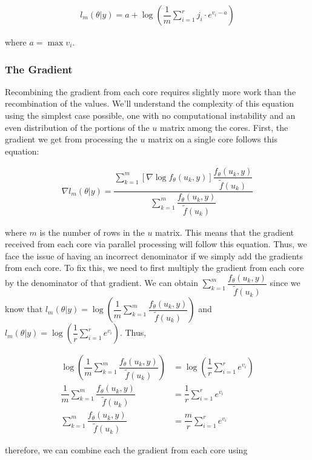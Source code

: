 \documentclass{article}
\begin{document}
\begin{align}
l_m(\theta|y) = a + \log(\dfrac{1}{m}\sum\limits_{i=1}^r j_i \cdot e^{v_i - a})
\end{align}

\noindent where $a = \max{v_i}$.

\subsubsection{The Gradient}
Recombining the gradient from each core requires slightly more work than the recombination of the values. We'll understand the complexity of this equation using the simplest case possible, one with no computational instability and an even distribution of the portions of the $u$ matrix among the cores. First, the gradient we get from processing the $u$ matrix on a single core follows this equation: 

\begin{align}
\nabla l_m(\theta|y)=
\dfrac{\sum_{k=1}^m   \left[  \nabla  \log f_\theta(u_k,y) \right]  \dfrac{f_\theta(u_k,y)}{\tilde{f}(u_k)} }{\sum_{k=1}^m  \dfrac{f_\theta(u_k,y)}{\tilde{f}(u_k)}  } 
\end{align}

\noindent where $m$ is the number of rows in the $u$ matrix. This means that the gradient received from each core via parallel processing will follow this equation. Thus, we face the issue of having an incorrect denominator if we simply add the gradients from each core. To fix this, we need to first multiply the gradient from each core by the denominator of that gradient. We can obtain $\sum_{k=1}^m  \dfrac{f_\theta(u_k,y)}{\tilde{f}(u_k)}$ since we know that $l_{m}(\theta|y) = \log \left( \dfrac{1}{m} \sum_{k=1}^m  \dfrac{ f_\theta(u_k,y)   }{\tilde{f}(u_k)} \right)$ and $l_m(\theta|y) = \log(\dfrac{1}{r}\sum\limits_{i=1}^r e^{v_i})$. Thus, 

\begin{align}
\log \left( \dfrac{1}{m} \sum_{k=1}^m  \dfrac{ f_\theta(u_k,y)   }{\tilde{f}(u_k)} \right) &= \log(\dfrac{1}{r}\sum\limits_{i=1}^r e^{v_i}) \\
\dfrac{1}{m} \sum_{k=1}^m  \dfrac{ f_\theta(u_k,y)   }{\tilde{f}(u_k)}  &= \dfrac{1}{r}\sum\limits_{i=1}^r e^{v_i} \\
\sum_{k=1}^m  \dfrac{ f_\theta(u_k,y)   }{\tilde{f}(u_k)}  &= \dfrac{m}{r} \sum\limits_{i=1}^r e^{v_i}
\end{align}

\noindent therefore, we can combine each the gradient from each core using
\end{document}
